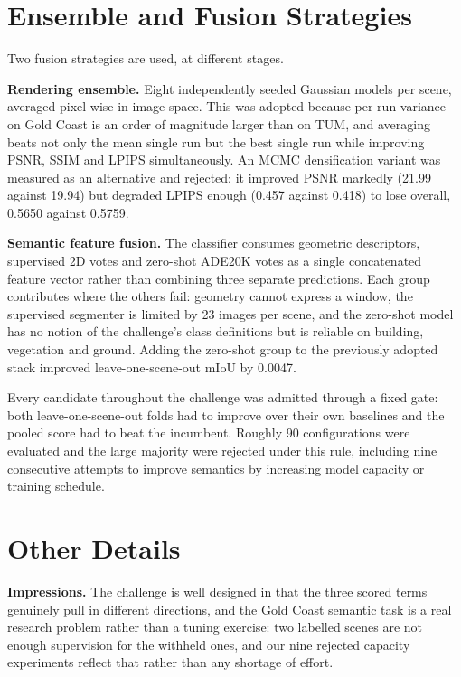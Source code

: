 \documentclass[10pt,twocolumn,letterpaper]{article}
\begin{document}
\section{Ensemble and Fusion Strategies}

Two fusion strategies are used, at different stages.

\textbf{Rendering ensemble.} Eight independently seeded Gaussian models per
scene, averaged pixel-wise in image space. This was adopted because per-run
variance on Gold Coast is an order of magnitude larger than on TUM, and
averaging beats not only the mean single run but the best single run while
improving PSNR, SSIM and LPIPS simultaneously. An MCMC densification variant was
measured as an alternative and rejected: it improved PSNR markedly (21.99
against 19.94) but degraded LPIPS enough (0.457 against 0.418) to lose overall,
0.5650 against 0.5759.

\textbf{Semantic feature fusion.} The classifier consumes geometric descriptors,
supervised 2D votes and zero-shot ADE20K votes as a single concatenated feature
vector rather than combining three separate predictions. Each group contributes
where the others fail: geometry cannot express a window, the supervised
segmenter is limited by 23 images per scene, and the zero-shot model has no
notion of the challenge's class definitions but is reliable on building,
vegetation and ground. Adding the zero-shot group to the previously adopted
stack improved leave-one-scene-out mIoU by 0.0047.

Every candidate throughout the challenge was admitted through a fixed gate:
both leave-one-scene-out folds had to improve over their own baselines and the
pooled score had to beat the incumbent. Roughly 90 configurations were evaluated
and the large majority were rejected under this rule, including nine consecutive
attempts to improve semantics by increasing model capacity or training schedule.

\section{Other Details}
\label{sec:other}

\textbf{Impressions.} The challenge is well designed in that the three scored
terms genuinely pull in different directions, and the Gold Coast semantic task
is a real research problem rather than a tuning exercise: two labelled scenes
are not enough supervision for the withheld ones, and our nine rejected capacity
experiments reflect that rather than any shortage of effort.
\end{document}
